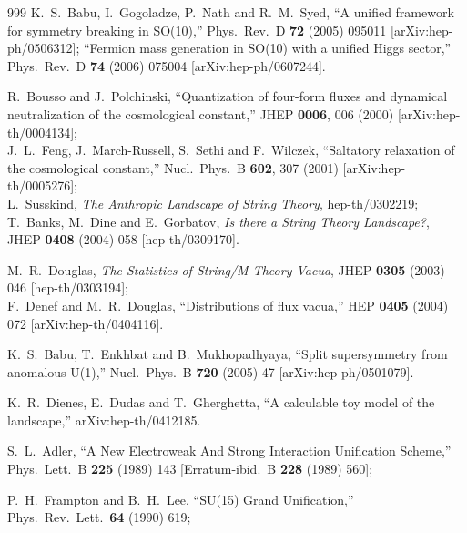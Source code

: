 \begin{thebibliography}{999}
  K.~S.~Babu, I.~Gogoladze, P.~Nath and R.~M.~Syed,
  ``A unified framework for symmetry breaking in SO(10),''
  Phys.\ Rev.\ D {\bf 72} (2005) 095011
  [arXiv:hep-ph/0506312];
  ``Fermion mass generation in SO(10) with a unified Higgs sector,''
  Phys.\ Rev.\  D {\bf 74} (2006) 075004
  [arXiv:hep-ph/0607244].


  R.~Bousso and J.~Polchinski,
  ``Quantization of four-form fluxes and dynamical neutralization of the
  cosmological constant,''
  JHEP {\bf 0006}, 006 (2000)
  [arXiv:hep-th/0004134];
\\
  J.~L.~Feng, J.~March-Russell, S.~Sethi and F.~Wilczek,
  ``Saltatory relaxation of the cosmological constant,''
  Nucl.\ Phys.\ B {\bf 602}, 307 (2001)
  [arXiv:hep-th/0005276];
\\
L.~Susskind,
{\it The Anthropic Landscape of String Theory},
hep-th/0302219;
\\
T.~Banks, M.~Dine and E.~Gorbatov,
{\it Is there a String Theory Landscape?},
JHEP {\bf 0408} (2004) 058
[hep-th/0309170]. 

M.~R.~Douglas,
{\it The Statistics of String/M Theory Vacua},
JHEP {\bf 0305} (2003) 046
[hep-th/0303194];
\\
 F.~Denef and M.~R.~Douglas, 
 ``Distributions of flux vacua,''
  HEP {\bf 0405} (2004) 072
  [arXiv:hep-th/0404116].

  K.~S.~Babu, T.~Enkhbat and B.~Mukhopadhyaya,
  ``Split supersymmetry from anomalous U(1),''
  Nucl.\ Phys.\  B {\bf 720} (2005) 47
  [arXiv:hep-ph/0501079].


 K.~R.~Dienes, E.~Dudas and T.~Gherghetta,
  ``A calculable toy model of the landscape,''
  arXiv:hep-th/0412185.

 S.~L.~Adler,
  ``A New Electroweak And Strong Interaction Unification Scheme,''
  Phys.\ Lett.\ B {\bf 225} (1989) 143
  [Erratum-ibid.\ B {\bf 228} (1989) 560];

  P.~H.~Frampton and B.~H.~Lee,
  ``SU(15) Grand Unification,''
  Phys.\ Rev.\ Lett.\  {\bf 64} (1990) 619;


\end{thebibliography}
